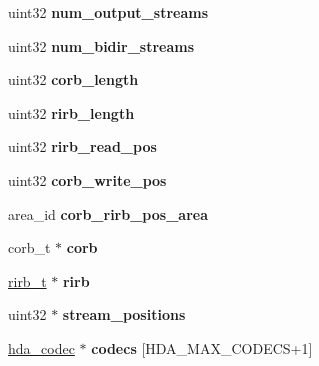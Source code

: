 \begin{DoxyCompactItemize}
uint32 {\bfseries num\+\_\+output\+\_\+streams}
\item 
\mbox{\label{structhda__controller_a2c59b2ddb608f94bdc3d18a4a2d25458}} 
uint32 {\bfseries num\+\_\+bidir\+\_\+streams}
\item 
\mbox{\label{structhda__controller_ad41cbf9f5b57dd9e6da4f021e835c962}} 
uint32 {\bfseries corb\+\_\+length}
\item 
\mbox{\label{structhda__controller_a7ddb8fcdd7bbe5a0cf1f9d5f5eadeb4f}} 
uint32 {\bfseries rirb\+\_\+length}
\item 
\mbox{\label{structhda__controller_a991b5bad3c0ccea37713c1f25e1480cf}} 
uint32 {\bfseries rirb\+\_\+read\+\_\+pos}
\item 
\mbox{\label{structhda__controller_ac1d0d5f8203e88841a9e6f841cc70516}} 
uint32 {\bfseries corb\+\_\+write\+\_\+pos}
\item 
\mbox{\label{structhda__controller_ab2175933359b6977a2d7d5b0bca84151}} 
area\+\_\+id {\bfseries corb\+\_\+rirb\+\_\+pos\+\_\+area}
\item 
\mbox{\label{structhda__controller_a8bec5f1183a2af7b88775f0ede33a3bf}} 
corb\+\_\+t $\ast$ {\bfseries corb}
\item 
\mbox{\label{structhda__controller_a3412e634dff94950c489bfe21759a4bf}} 
\hyperlink{structrirb__t}{rirb\+\_\+t} $\ast$ {\bfseries rirb}
\item 
\mbox{\label{structhda__controller_a55a09757334d89890244c52236617b58}} 
uint32 $\ast$ {\bfseries stream\+\_\+positions}
\item 
\mbox{\label{structhda__controller_acd664eec54c1632a52b3698ff6d46784}} 
\hyperlink{structhda__codec}{hda\+\_\+codec} $\ast$ {\bfseries codecs} \mbox{[}H\+D\+A\+\_\+\+M\+A\+X\+\_\+\+C\+O\+D\+E\+CS+1\mbox{]}
\item 
\mbox{\label{structhda__controller_adb707b6b0a1064e577861d14553c633b}} 

\end{DoxyCompactItemize}
